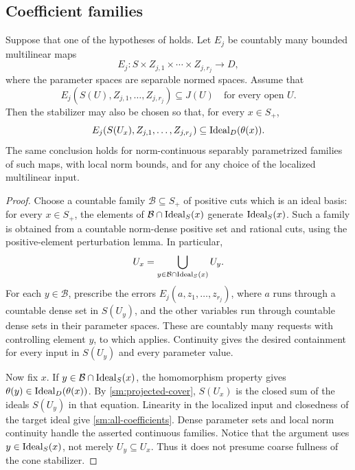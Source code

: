 \subsection{Coefficient families}

\begin{corollary}
\label{sm:coefficient-domination}
Suppose that one of the hypotheses of
 holds.  Let \(E_j\) be countably
many bounded multilinear maps
\[
 E_j:S\times Z_{j,1}\times\cdots\times Z_{j,r_j}\longrightarrow D,
\]
where the parameter spaces are separable normed spaces.
Assume that
\[
 E_j(S(U),Z_{j,1},\ldots,Z_{j,r_j})\subseteq J(U)
 \quad\text{for every open }U.
\]
Then the stabilizer may also be chosen so that, for every
\(x\in S_+\),
\begin{equation}\label{sm:all-coefficients}
 E_j(S(U_x),Z_{j,1},\ldots,Z_{j,r_j})
 \subseteq\operatorname{Ideal}_D(\theta(x)).
\end{equation}
The same conclusion holds for norm-continuous separably
parametrized families of such maps, with local norm bounds,
and for any choice of the localized multilinear input.
\end{corollary}

\begin{proof}
Choose a countable family \(\mathcal B\subseteq S_+\) of
positive cuts which is an ideal basis: for every \(x\in S_+\),
the elements of \(\mathcal B\cap\operatorname{Ideal}_S(x)\) generate
\(\operatorname{Ideal}_S(x)\).  Such a family is obtained from a countable
norm-dense positive set and rational cuts, using the
positive-element perturbation lemma.  In particular,
\begin{equation}\label{sm:projected-cover}
 U_x=\bigcup_{y\in\mathcal B\cap\operatorname{Ideal}_S(x)}U_y.
\end{equation}
For each \(y\in\mathcal B\), prescribe the errors
\(E_j(a,z_1,\ldots,z_{r_j})\), where \(a\) runs through
a countable dense set in \(S(U_y)\), and the other variables
run through countable dense sets in their parameter spaces.
These are countably many requests with controlling element
\(y\), to which  applies.
Continuity gives the desired containment for every input in
\(S(U_y)\) and every parameter value.

Now fix \(x\).  If \(y\in\mathcal B\cap\operatorname{Ideal}_S(x)\),
the homomorphism property gives
\(\theta(y)\in\operatorname{Ideal}_D(\theta(x))\).
By \eqref{sm:projected-cover}, \(S(U_x)\) is the closed sum
of the ideals \(S(U_y)\) in that equation.  Linearity in
the localized input and closedness of the target ideal give
\eqref{sm:all-coefficients}.  Dense parameter sets and local
norm continuity handle the asserted continuous families.
Notice that the argument uses
\(y\in\operatorname{Ideal}_S(x)\), not merely \(U_y\subseteq U_x\).
Thus it does not presume coarse fullness of the cone
stabilizer.
\end{proof}


